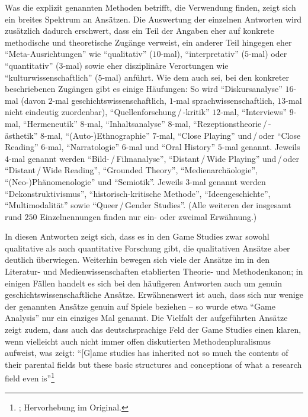 \documentclass{scrartcl}
\begin{document}
Was die explizit genannten Methoden betrifft, die Verwendung finden, zeigt sich ein breites Spektrum an Ansätzen.
Die Auswertung der einzelnen Antworten wird zusätzlich dadurch erschwert, dass ein Teil der Angaben eher auf konkrete methodische und theoretische Zugänge verweist, ein anderer Teil hingegen eher \enquote{Meta-Ausrichtungen} wie \enquote{qualitativ} ($10$-mal), \enquote{interpretativ} ($5$-mal) oder \enquote{quantitativ} ($3$-mal) sowie eher disziplinäre Verortungen wie \enquote{kulturwissenschaftlich} ($5$-mal) anführt.
Wie dem auch sei, bei den konkreter beschriebenen Zugängen gibt es einige Häufungen:
So wird \enquote{Diskursanalyse} $16$-mal (davon $2$-mal geschichtswissenschaftlich, $1$-mal sprachwissenschaftlich, $13$-mal nicht eindeutig zuordenbar), \enquote{Quellenforschung\,/\,-kritik} $12$-mal, \enquote{Interviews} $9$-mal, \enquote{Hermeneutik} $8$-mal, \enquote{Inhaltsanalyse} $8$-mal, \enquote{Rezeptionstheorie\,/\,-ästhetik} $8$-mal, \enquote{(Auto-)Ethnographie} $7$-mal, \enquote{Close Playing} und\,/\,oder \enquote{Close Reading} $6$-mal, \enquote{Narratologie} $6$-mal und \enquote{Oral History} $5$-mal genannt.
Jeweils $4$-mal genannt werden \enquote{Bild-\,/\,Filmanalyse}, \enquote{Distant\,/\,Wide Playing} und\,/\,oder \enquote{Distant\,/\,Wide Reading}, \enquote{Grounded Theory}, \enquote{Medienarchäologie}, \enquote{(Neo-)Phänomenologie} und \enquote{Semiotik}.
Jeweils $3$-mal genannt werden \enquote{Dekonstruktivismus}, \enquote{historisch-kritische Methode}, \enquote{Ideengeschichte}, \enquote{Multimodalität} sowie \enquote{Queer\,/\,Gender Studies}.
(Alle weiteren der insgesamt rund $250$ Einzelnennungen finden nur ein- oder zweimal Erwähnung.)

In diesen Antworten zeigt sich, dass es in den Game Studies zwar sowohl qualitative als auch quantitative Forschung gibt, die qualitativen Ansätze aber deutlich überwiegen.
Weiterhin bewegen sich viele der Ansätze im in den Literatur- und Medienwissenschaften etablierten Theorie- und Methodenkanon; in einigen Fällen handelt es sich bei den häufigeren Antworten auch um genuin geschichtswissenschaftliche Ansätze.
Erwähnenswert ist auch, dass sich nur wenige der genannten Ansätze genuin auf Spiele beziehen -- so wurde etwa \enquote{Game Analysis} nur ein einziges Mal genannt.
Die Vielfalt der aufgeführten Ansätze zeigt zudem, dass auch das deutschsprachige Feld der Game Studies einen klaren, wenn vielleicht auch nicht immer offen diskutierten Methodenpluralismus aufweist, was zeigt:
\enquote{[G]ame studies has inherited not so much the contents of their parental fields but these basic structures and conceptions of what a research field even is}\footnote{\autocite[][S.~236]{unterhuber_parents_2025}; Hervorhebung im Original.}
\end{document}
